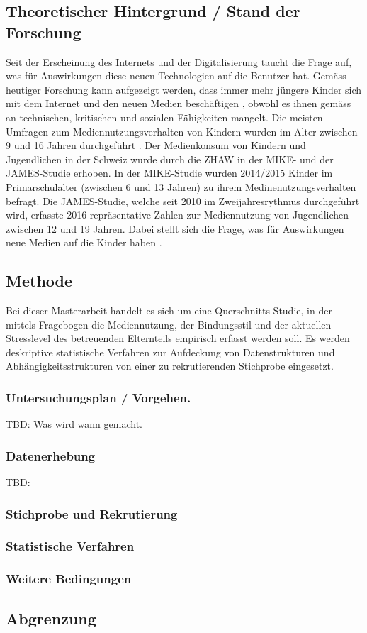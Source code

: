 \subsection{Theoretischer Hintergrund / Stand der Forschung}
\begin{flushleft}
Seit der Erscheinung des Internets und der Digitalisierung taucht die Frage auf, was für Auswirkungen diese neuen Technologien auf die Benutzer hat. Gemäss heutiger Forschung kann aufgezeigt werden, dass immer mehr jüngere Kinder sich mit dem Internet und den neuen Medien beschäftigen \cite{Chaudron2015}, obwohl es ihnen gemäss  an technischen, kritischen und sozialen Fähigkeiten mangelt.
Die meisten Umfragen zum Mediennutzungsverhalten von Kindern wurden im Alter zwischen 9 und 16 Jahren durchgeführt \cite{Chaudron2015}. Der Medienkonsum von Kindern und Jugendlichen in der Schweiz wurde durch die ZHAW in der MIKE- und der JAMES-Studie \cite{Suter2015, Waller2016} erhoben. In der MIKE-Studie wurden 2014/2015 Kinder im Primarschulalter (zwischen 6 und 13 Jahren) zu ihrem Medinenutzungsverhalten befragt. Die JAMES-Studie, welche seit 2010 im Zweijahresrythmus durchgeführt wird, erfasste 2016 repräsentative Zahlen zur Mediennutzung von Jugendlichen zwischen 12 und 19 Jahren. 
Dabei stellt sich die Frage, was für Auswirkungen neue Medien auf die Kinder haben \cite{Livingstone2015}.  


\end{flushleft}
\subsection{Methode}
\begin{flushleft}
Bei dieser Masterarbeit handelt es sich um eine Querschnitts-Studie, in der mittels Fragebogen die Mediennutzung, der Bindungsstil und der aktuellen Stresslevel des betreuenden Elternteils empirisch erfasst werden soll. 
Es werden deskriptive statistische Verfahren zur Aufdeckung von Datenstrukturen und Abhängigkeitsstrukturen von einer zu rekrutierenden Stichprobe eingesetzt.
\end{flushleft}
\subsubsection{Untersuchungsplan / Vorgehen.}
TBD: Was wird wann gemacht.
\subsubsection{Datenerhebung}
TBD: 
\subsubsection{Stichprobe und Rekrutierung}
\subsubsection{Statistische Verfahren}
\subsubsection{Weitere Bedingungen}
\subsection{Abgrenzung}
